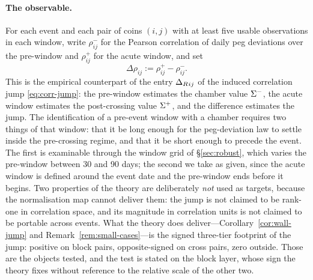 \paragraph{The observable.} For each event and each pair of coins $(i,j)$ with at least five usable observations in each window, write $\rho^-_{ij}$ for the Pearson correlation of daily peg deviations over the pre-window and $\rho^+_{ij}$ for the acute window, and set
\begin{equation}\label{eq:delta-rho}
\Delta\rho_{ij} := \rho^+_{ij} - \rho^-_{ij}.
\end{equation}
This is the empirical counterpart of the entry $\Delta_R{}_{ij}$ of the induced correlation jump \eqref{eq:corr-jump}: the pre-window estimates the chamber value $\Sigma^-$, the acute window estimates the post-crossing value $\Sigma^+$, and the difference estimates the jump. The identification of a pre-event window with a chamber requires two things of that window: that it be long enough for the peg-deviation law to settle inside the pre-crossing regime, and that it be short enough to precede the event. The first is examinable through the window grid of \S\ref{sec:robust}, which varies the pre-window between 30 and 90 days; the second we take as given, since the acute window is defined around the event date and the pre-window ends before it begins. Two properties of the theory are deliberately \emph{not} used as targets, because the normalisation map cannot deliver them: the jump is not claimed to be rank-one in correlation space, and its magnitude in correlation units is not claimed to be portable across events. What the theory does deliver---Corollary~\ref{cor:wall-jump} and Remark~\ref{rem:small-cases}---is the signed three-tier footprint of the jump: positive on block pairs, opposite-signed on cross pairs, zero outside. Those are the objects tested, and the test is stated on the block layer, whose sign the theory fixes without reference to the relative scale of the other two.

